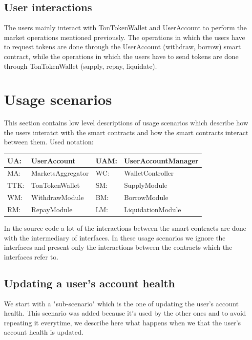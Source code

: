 \subsection{User interactions}

The users mainly interact with TonTokenWallet and UserAccount to perform the market operations mentioned previously. The operations in which the users have to request tokens are done through the UserAccount (withdraw, borrow) smart contract, while the operations in which the users have to send tokens are done through TonTokenWallet (supply, repay, liquidate). %

\section{Usage scenarios}

This section contains low level descriptions of usage scenarios which describe how the users interatct with the smart contracts and how the smart contracts interact between them.
\newpage
Used notation:

\begin{tabularx}{\textwidth}{|l X|l X|} \hline
  UA: & UserAccount &         UAM: & UserAccountManager \\\hline
  MA: & MarketsAggregator &   WC: & WalletController \\\hline
  TTK: & TonTokenWallet &     SM: & SupplyModule \\\hline
  WM: & WithdrawModule &      BM: & BorrowModule \\\hline
  RM: & RepayModule &         LM: & LiquidationModule \\\hline
\end{tabularx}

In the source code a lot of the interactions between the smart contracts are done with the intermediary of interfaces. In these usage scenarios we ignore the interfaces and present only the interactions between the contracts which the interfaces refer to.

\subsection{Updating a user's account health}
We start with a "sub-scenario" which is the one of updating the user's account health. This scenario was added because it's used by the other ones and to avoid repeating it everytime, we describe here what happens when we that the user's account health is updated.

